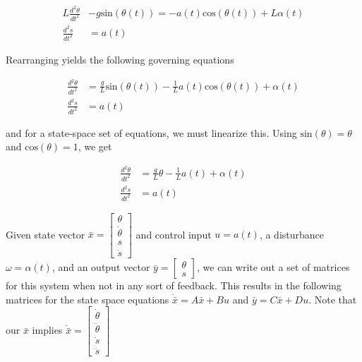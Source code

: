 \documentclass[10pt]{article}
\begin{document}
\begin{align*}
    L\frac{d^{2}\theta}{dt^{2}} &- g\text{sin}(\theta(t)) = -a(t)\text{cos}(\theta(t)) + L\alpha(t) \\
    \frac{d^2s}{dt^2} &= a(t)
\end{align*}

Rearranging yields the following governing equations

\begin{align*}
    \frac{d^{2}\theta}{dt^{2}} &= \frac{g}{L}\text{sin}(\theta(t)) - \frac{1}{L}a(t)\text{cos}(\theta(t)) + \alpha(t) \\
    \frac{d^2s}{dt^2} &= a(t)
\end{align*}

and for a state-space set of equations, we must linearize this. Using $\text{sin}(\theta) = \theta$ and $\text{cos}(\theta) = 1$, we get

\begin{align*}
    \frac{d^{2}\theta}{dt^{2}} &= \frac{g}{L}\theta - \frac{1}{L}a(t) + \alpha(t) \\
    \frac{d^2s}{dt^2} &= a(t)
\end{align*}

Given state vector $\bar{x} = \begin{bmatrix} \theta \\ \dot{\theta} \\ s \\ \dot{s} \end{bmatrix}$ and control input $u = a(t)$, a disturbance $\omega = \alpha(t)$, and an output vector $\bar{y} = \begin{bmatrix} \theta \\ s \end{bmatrix}$, we can write out a set of matrices for this system when not in any sort of feedback. This results in the following matrices for the state space equations $\dot{\bar{x}} = A\bar{x} + Bu$ and $\bar{y} = C\bar{x} + Du$. Note that our $\bar{x}$ implies $\dot{\bar{x}} = \begin{bmatrix} \dot{\theta} \\ \ddot{\theta} \\ \dot{s} \\ \ddot{s} \end{bmatrix}$
\end{document}
